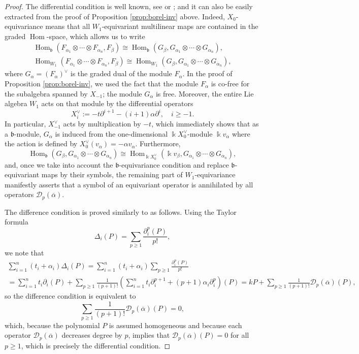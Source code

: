 \documentclass[11pt,reqno]{amsart}
\theoremstyle{plain}
\theoremstyle{definition}
\theoremstyle{remark}
\newcommand{\bk}{\Bbbk}
\DeclareMathOperator{\Hom}{Hom}
\newcommand{\cD}{\mathcal D}
\begin{document}
\begin{proof}
The differential condition is well known, see \cite[Lemma 4]{MR611158} or \cite[Sec.~2.2]{MR659165}; and it can also be easily extracted from the proof of Proposition \ref{prop:borel-inv} above. Indeed, $X_0$-equivariance means that all $W_1$-equivariant multilinear maps are contained in the graded $\Hom$-space, which allows us to write
\begin{gather*}
\Hom_{\mathfrak{b}}(F_{\alpha_1}\otimes\cdots\otimes F_{\alpha_n},F_\beta)\cong\Hom_{\mathfrak{b}}(G_\beta,G_{\alpha_1}\otimes\cdots\otimes G_{\alpha_n}),\\
\Hom_{W_1}(F_{\alpha_1}\otimes\cdots\otimes F_{\alpha_n},F_\beta)\cong\Hom_{W_1}(G_\beta,G_{\alpha_1}\otimes\cdots\otimes G_{\alpha_n}),     
\end{gather*}
where $G_\alpha=(F_\alpha)^\vee$ is the graded dual of the module $F_\alpha$. In the proof of Proposition \ref{prop:borel-inv}, we used the fact that the module $F_\alpha$ is co-free for the subalgebra spanned by $X_{-1}$; the module $G_\alpha$ is free. Moreover, the entire Lie algebra $W_1$ acts on that module by the differential operators 
 \[
X_i^\vee:=-t\partial^{i+1}-(i+1)\alpha\partial^i, \quad i\ge -1. 
 \] 
In particular, $X_{-1}^\vee$ acts by multiplication by $-t$, which immediately shows that as a $\mathfrak{b}$-module, $G_\alpha$ is induced from the one-dimensional $\bk X_0^\vee$-module $\bk v_\alpha$ where the action is defined by $X_0^\vee(v_\alpha)=-\alpha v_\alpha$.  
Furthermore,
 \[
\Hom_{\mathfrak{b}}(G_\beta,G_{\alpha_1}\otimes\cdots\otimes G_{\alpha_n})\cong 
\Hom_{\bk X_0^\vee}(\bk v_\beta,G_{\alpha_1}\otimes\cdots\otimes G_{\alpha_n}), 
 \]
and, once we take into account the $\mathfrak{b}$-equivariance condition and replace $\mathfrak{b}$-equivariant maps by their symbols, the remaining part of $W_1$-equivariance manifestly asserts that a symbol of an equivariant operator is annihilated by all operators $\cD_p(\overline\alpha)$.

The difference condition is proved similarly to \cite[Lemma 4']{MR611158} as follows. Using the Taylor formula
 \[
\Delta_i(P)=\sum_{p\ge 1}\frac{\partial_i^p(P)}{p!}, 
 \]
we note that    
\begin{multline*}
\sum_{i=1}^n(t_i+\alpha_i)\Delta_i(P)=\sum_{i=1}^n (t_i+\alpha_i)\sum_{p\ge 1}\frac{\partial_i^p(P)}{p!}\\
=\sum_{i=1}^n t_i\partial_i(P)+\sum_{p\ge 1}\frac{1}{(p+1)!}\left(\sum_{i=1}^n
t_i\partial_i^{p+1}+(p+1)\alpha_i\partial_i^p\right)(P)
=k P+\sum_{p\ge 1}\frac{1}{(p+1)!}\cD_p(\overline\alpha)(P),
\end{multline*}
so the difference condition is equivalent to 
 \[
\sum_{p\ge 1} \frac{1}{(p+1)!}\cD_p(\overline\alpha)(P)=0, 
 \]
which, because the polynomial $P$ is assumed homogeneous and because each operator $\cD_p(\overline\alpha)$ decreases degree by $p$, implies that $\cD_p(\overline\alpha)(P)=0$ for all $p\ge 1$, which is precisely the differential condition. 


\end{proof}
\end{document}
